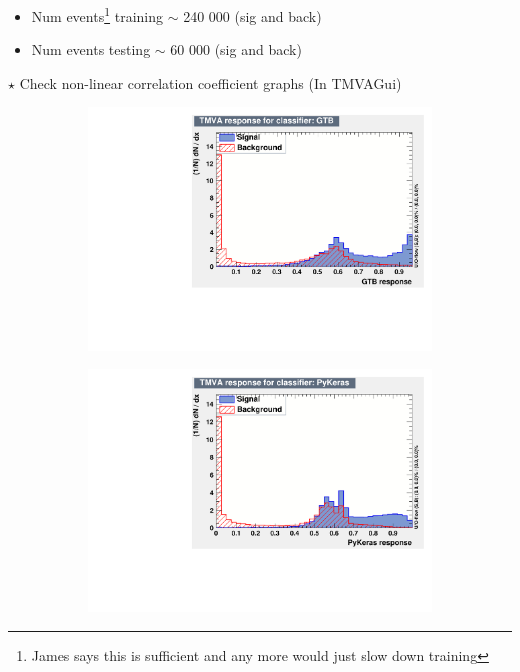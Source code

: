 \documentclass[]{article}
\begin{document}
\begin{itemize}
	\item Num events\footnote{James says this is sufficient and any more would just slow down training} training $\sim$ 240 000 (sig and back)
	\item Num events testing $\sim$ 60 000 (sig and back)
\end{itemize}
$\star$ Check non-linear correlation coefficient graphs (In TMVAGui)
\pagebreak

\begin{figure}[!h]
	\begin{subfigure}[b]{0.4\textwidth}
		\includegraphics[width=\textwidth]{gtb_response.pdf}
		
	\end{subfigure}
	\begin{subfigure}[b]{0.4\textwidth}
		\includegraphics[width=\textwidth]{keras_response.pdf}
		
	\end{subfigure}
\end{figure}
\end{document}
